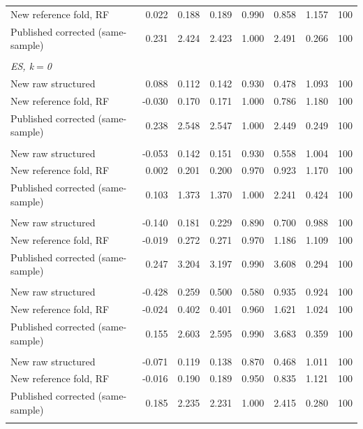 {\begin{longtable}{lrrrrrrr}
\quad New reference fold, RF & 0.022 & 0.188 & 0.189 & 0.990 & 0.858 & 1.157 & 100 \\
\quad Published corrected (same-sample) & 0.231 & 2.424 & 2.423 & 1.000 & 2.491 & 0.266 & 100 \\
\addlinespace
\multicolumn{8}{l}{\textit{degree $d=3$}} \\
\multicolumn{8}{l}{\textit{ES, k$=$0}} \\
\quad New raw structured & 0.088 & 0.112 & 0.142 & 0.930 & 0.478 & 1.093 & 100 \\
\quad New reference fold, RF & -0.030 & 0.170 & 0.171 & 1.000 & 0.786 & 1.180 & 100 \\
\quad Published corrected (same-sample) & 0.238 & 2.548 & 2.547 & 1.000 & 2.449 & 0.249 & 100 \\
\addlinespace
\multicolumn{8}{l}{\textit{ES, k$=$1}} \\
\quad New raw structured & -0.053 & 0.142 & 0.151 & 0.930 & 0.558 & 1.004 & 100 \\
\quad New reference fold, RF & 0.002 & 0.201 & 0.200 & 0.970 & 0.923 & 1.170 & 100 \\
\quad Published corrected (same-sample) & 0.103 & 1.373 & 1.370 & 1.000 & 2.241 & 0.424 & 100 \\
\addlinespace
\multicolumn{8}{l}{\textit{ES, k$=$2}} \\
\quad New raw structured & -0.140 & 0.181 & 0.229 & 0.890 & 0.700 & 0.988 & 100 \\
\quad New reference fold, RF & -0.019 & 0.272 & 0.271 & 0.970 & 1.186 & 1.109 & 100 \\
\quad Published corrected (same-sample) & 0.247 & 3.204 & 3.197 & 0.990 & 3.608 & 0.294 & 100 \\
\addlinespace
\multicolumn{8}{l}{\textit{ES, k$=$3}} \\
\quad New raw structured & -0.428 & 0.259 & 0.500 & 0.580 & 0.935 & 0.924 & 100 \\
\quad New reference fold, RF & -0.024 & 0.402 & 0.401 & 0.960 & 1.621 & 1.024 & 100 \\
\quad Published corrected (same-sample) & 0.155 & 2.603 & 2.595 & 0.990 & 3.683 & 0.359 & 100 \\
\addlinespace
\multicolumn{8}{l}{\textit{ATT, ATT}} \\
\quad New raw structured & -0.071 & 0.119 & 0.138 & 0.870 & 0.468 & 1.011 & 100 \\
\quad New reference fold, RF & -0.016 & 0.190 & 0.189 & 0.950 & 0.835 & 1.121 & 100 \\
\quad Published corrected (same-sample) & 0.185 & 2.235 & 2.231 & 1.000 & 2.415 & 0.280 & 100 \\
\addlinespace
\end{longtable}
}
